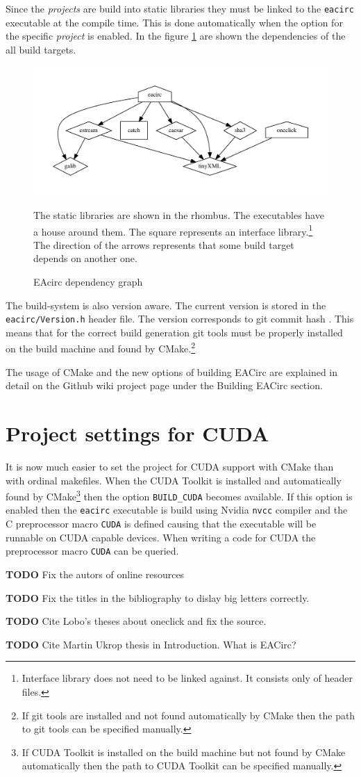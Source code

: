 \documentclass[12pt,oneside]{fithesis2}
\newcommand{\todo}{
	\noindent
	{\large\color{red}\textbf{TODO}}
}
\begin{document}
\noindent
Since the \emph{projects} are build into static libraries they must be linked to the \texttt{eacirc} executable at the compile time. This is done automatically when the option for the specific \emph{project} is enabled. In the figure \ref{fig:deps} are shown the dependencies of the all build targets.
	\begin{figure}[H]
	\begin{center}
		\includegraphics[width=.8\textwidth]{figures/deps}
	\end{center}
	\caption{EAcirc dependency graph}
	\label{fig:deps}
	\small
	The static libraries are shown in the rhombus. The executables have a house around them. The square represents an interface library.\footnote{Interface library does not need to be linked against. It consists only of header files.} The direction of the arrows represents that some build target depends on another one.
	\end{figure}

\noindent
The build-system is also version aware. The current version is stored in the \texttt{eacirc/Version.h} header file. The version corresponds to git commit hash \cite{git_book}. This means that for the correct build generation git tools must be properly installed on the build machine and found by CMake.\footnote{If git tools are installed and not found automatically by CMake then the path to git tools can be specified manually.}

The usage of CMake and the new options of building EACirc are explained in detail on the Github wiki project page under the Building EACirc section.

\section{Project settings for CUDA}

It is now much easier to set the project for CUDA support with CMake than with ordinal makefiles. When the CUDA Toolkit \cite{cuda_toolkit} is installed and automatically found by CMake\footnote{If CUDA Toolkit is installed on the build machine but not found by CMake automatically then the path to CUDA Toolkit can be specified manually.} then the option \texttt{BUILD\_CUDA} becomes available. If this option is enabled then the \texttt{eacirc} executable is build using Nvidia \cite{nvidia} \texttt{nvcc} compiler and the C preprocessor macro \texttt{CUDA} is defined causing that the executable will be runnable on CUDA capable devices. When writing a code for CUDA the preprocessor macro \texttt{CUDA} can be queried.

\printbibliography[heading=bibintoc]
\todo{Fix the autors of online resources}

\todo{Fix the titles in the bibliography to dislay big letters correctly.}

\todo{Cite Lobo's theses about oneclick and fix the source.}

\todo{Cite Martin Ukrop thesis in Introduction. What is EACirc?}
\end{document}
